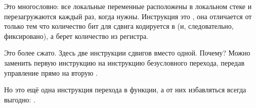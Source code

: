 



Это многословно: все локальные переменные расположены в локальном стеке и перезагружаются каждый раз,
когда нужны.
Инструкция \SLLV это , она отличается от \SLL только тем что
количество бит для сдвига кодируется в \SLL (и, следовательно, фиксировано), а \SLL берет количество из регистра.


Это более сжато.
Здесь две инструкции сдвигов вместо одной.
Почему?
Можно заменить первую инструкцию \SLLV на инструкцию безусловного перехода, передав управление прямо
на вторую \SLLV.

Но это ещё одна инструкция перехода в функции, а от них избавляться всегда выгодно: .


